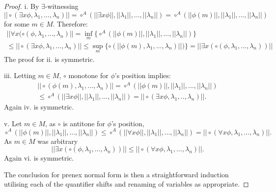 \documentclass[10pt,a4paper]{amsart}
\begin{document}
\begin{proof}
    i. By $\exists$-witnessing \[||\circ(\exists x\phi,\lambda_1,...,\lambda_n)||=\circ^A(||\exists x\phi||,||\lambda_1||,...,||\lambda_n||)=\circ^A(||\phi(m)||,||\lambda_1||,...,||\lambda_n||)\] 
    for some $m\in M$. Therefore:\begin{multline*}
    ||\forall x(\circ(\phi,\lambda_1,...,\lambda_n)||=\inf_{m}\{\circ^A(||\phi(m)||,||\lambda_1||,...,||\lambda_n||)\}\\
    \leq ||\circ(\exists x\phi,\lambda_1,...,\lambda_n)||\leq \sup_{m}\{\circ(||\phi(m),\lambda_1,...,\lambda_n)||)\}=||\exists x(\circ(\phi,\lambda_1,...,\lambda_n))||
    \end{multline*} 
    The proof for ii. is symmetric. 

    iii. Letting $m\in M$, $\circ$ monotone for $\phi$'s position implies:\begin{multline*}
    ||\circ(\phi(m),\lambda_1,...,\lambda_n)||=\circ^A(||\phi(m)||,||\lambda_1||,...,||\lambda_n||)\\\leq \circ^A(||\exists x\phi||,||\lambda_1||,...,||\lambda_n||)=||\circ(\exists x\phi,\lambda_1,..,\lambda_n)||.
    \end{multline*}
    Again iv. is symmetric. 

    v. Let $m\in M$, as $\circ$ is antitone for $\phi$'s position, \[\circ^A(||\phi(m)||,||\lambda_1||,...,||\lambda_n||)\leq \circ^A(||\forall x\phi||,||\lambda_1||,...,||\lambda_n||)=||\circ(\forall x\phi,\lambda_1,...,\lambda_n)||.\]
    As $m\in M$ was arbitrary \[||\exists x(\circ(\phi,\lambda_1,...,\lambda_n))||\leq ||\circ(\forall x\phi,\lambda_1,...,\lambda_n)||.\] 
    Again vi. is symmetric. 

    The conclusion for prenex normal form is then a straightforward induction utilising each of the quantifier shifts and renaming of variables as appropriate.
\end{proof}
\end{document}
